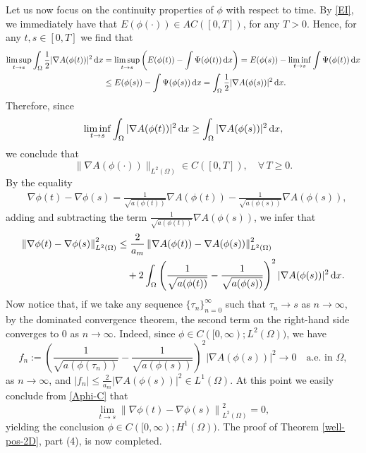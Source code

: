 \documentclass[11pt,reqno]{amsart}
\theoremstyle{remark}
\def\d{{\rm d}}
\numberwithin{equation}{section}
\def\d{{\rm d}}
\begin{document}
\smallskip Let us now focus on the continuity properties of $\phi$ with respect to time. By \eqref{EI}, we immediately have that $E(\phi(\cdot)) \in AC([0,T])$, for any $T>0$. Hence, for any $t,s\in [0,T]$ we find that
\begin{align*}
\limsup_{t \to s} \int_\Omega \frac12 |\nabla A(\phi(t))|^2 \, \d x
&= \limsup_{t \to s} \left( E(\phi(t))- \int \Psi(\phi(t)) \, \d x\right)
= E(\phi(s)) - \liminf_{t \to s} \int \Psi(\phi(t)) \, \d x
\\
&\leq E(\phi(s)) - \int \Psi(\phi(s)) \, \d x= \int_\Omega \frac12 |\nabla A(\phi(s))|^2 \, \d x.
\end{align*}
Therefore, since
$$
\liminf_{t \to s} \int_\Omega |\nabla A(\phi(t))|^2 \, \d x\geq
\int_\Omega |\nabla A(\phi(s))|^2 \, \d x,
$$
we conclude that
\begin{equation}
\label{Aphi-C}
\|\nabla A(\phi(\cdot))\|_{L^2(\Omega)}\in C([0,T]), \quad \forall \, T\geq 0.
\end{equation}
By the equality
\begin{align*}
&\nabla \phi(t) -\nabla \phi(s)=
\frac{1}{\sqrt{a(\phi(t))}}\nabla A(\phi(t)) -\frac{1}{\sqrt{a(\phi(s))}}\nabla A(\phi(s)),%
\end{align*}
adding and subtracting the term $\frac{1}{\sqrt{a(\phi(t))}}\nabla A(\phi(s))$, 
we infer that
\begin{align*}
\left\|\nabla \phi(t)-\nabla \phi(s)\right\|_{L^2(\Omega)}^2
&\leq
\frac{2}{a_m}\left\|\nabla A(\phi(t))-\nabla A(\phi(s))\right\|^2_{L^2(\Omega)}\\
&\quad +
2\int_\Omega\left(\frac{1}{\sqrt{a(\phi(t))}}-\frac{1}{\sqrt{a(\phi(s))}}\right)^2|\nabla A(\phi(s))|^2\,\d x.
\end{align*}
Now notice that, if we take any sequence $\lbrace \tau_n \rbrace_{n=0}^\infty$ such that $\tau_n \to s$ as $n \to \infty$, by the dominated convergence theorem,
the second term on the right-hand
side converges to 0 as $n\to\infty$. Indeed, since $\phi \in C([0,\infty); L^2(\Omega))$, we have
$$f_n:=\left(\frac{1}{\sqrt{a(\phi(\tau_n))}}-\frac{1}{\sqrt{a(\phi(s))}}\right)^2|\nabla A(\phi(s))|^2\to 0\quad \text{a.e. in } \Omega,$$
as $n\to\infty$, and $|f_n|\leq \frac{2}{a_m}|\nabla A(\phi(s))|^2\in L^1(\Omega)$.
At this point we easily conclude from \eqref{Aphi-C} that
$$\lim_{t\to s}\left\|\nabla \phi(t)-\nabla \phi(s)\right\|_{L^2(\Omega)}^2=0,$$
yielding the conclusion $\phi \in C([0,\infty); H^1(\Omega))$.
The proof of Theorem \ref{well-pos-2D}, part (4), is now completed. 
\end{document}
